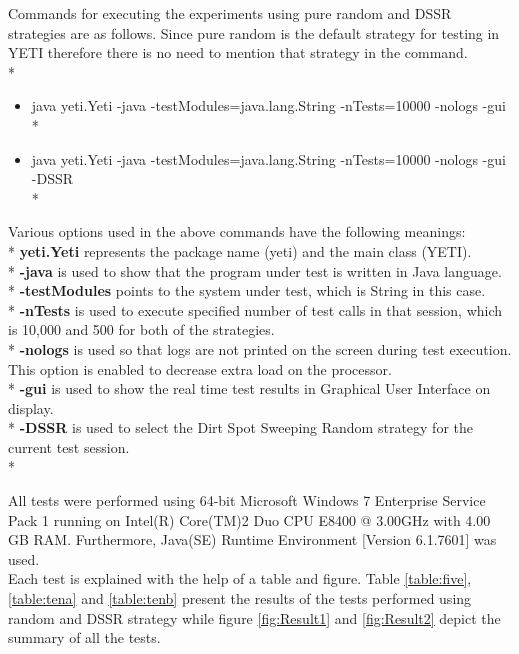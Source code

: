Commands for executing the experiments using pure random and DSSR strategies are as follows. Since pure random is the default strategy for testing in YETI therefore there is no need to mention that strategy in the command.\\*

\begin{itemize}

\item java yeti.Yeti -java -testModules=java.lang.String -nTests=10000 -nologs -gui\\*

\item java yeti.Yeti -java -testModules=java.lang.String -nTests=10000 -nologs -gui -DSSR\\*

\end{itemize}

Various options used in the above commands have the following meanings:\\*
\textbf{yeti.Yeti} represents the package name (yeti) and the main class (YETI).\\*
\textbf{-java} is used to show that the program under test is written in Java language.\\*
\textbf{-testModules} points to the system under test, which is String in this case.\\*
\textbf{-nTests} is used to execute specified number of test calls in that session, which is 10,000 and 500 for both of the strategies.\\*
\textbf{-nologs} is used so that logs are not printed on the screen during test execution. This option is enabled to decrease extra load on the processor.\\*
\textbf{-gui} is used to show the real time test results in Graphical User Interface on display.\\*
\textbf{-DSSR} is used to select the Dirt Spot Sweeping Random strategy for the current test session.\\*

All tests were performed using 64-bit Microsoft Windows 7 Enterprise Service Pack 1 running on Intel(R) Core(TM)2 Duo CPU E8400 @ 3.00GHz with 4.00 GB RAM. Furthermore, Java(SE) Runtime Environment [Version 6.1.7601] was used.\\

Each test is explained with the help of a table and figure. Table \ref{table:five}, \ref{table:tena} and \ref{table:tenb} present the results of the tests performed using random and DSSR strategy while figure \ref{fig:Result1} and \ref{fig:Result2} depict the summary of all the tests.



